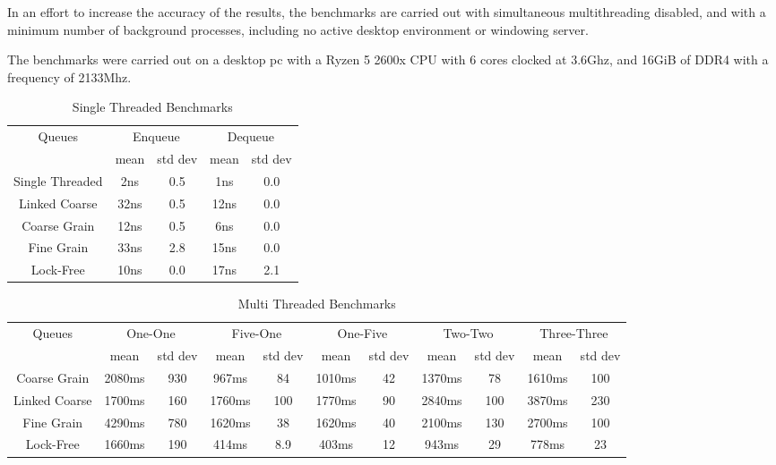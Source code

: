 \documentclass{article}
\begin{document}
In an effort to increase the accuracy of the results, the benchmarks are carried
out with simultaneous multithreading disabled, and with a minimum number of
background processes, including no active desktop environment or windowing
server.

The benchmarks were carried out on a desktop pc with a Ryzen 5 2600x CPU with 6
cores clocked at 3.6Ghz, and 16GiB of DDR4 with a frequency of 2133Mhz.

\begin{table}[h]
\centering
\begin{tabular}{c|cccc}
\hline
\multirow{2}{*}{Queues} & \multicolumn{2}{c}{Enqueue} & \multicolumn{2}{c}{Dequeue} \\
                        & mean        & std dev       & mean        & std dev       \\ \hline
Single Threaded         & 2ns         & 0.5           & 1ns         & 0.0           \\
Linked Coarse           & 32ns        & 0.5           & 12ns        & 0.0           \\
Coarse Grain            & 12ns        & 0.5           & 6ns         & 0.0           \\
Fine Grain              & 33ns        & 2.8           & 15ns        & 0.0           \\
Lock-Free               & 10ns        & 0.0           & 17ns        & 2.1          
\end{tabular}
\caption{Single Threaded Benchmarks}
\label{tab:single-threaded}
\end{table}

\begin{table}[h]
\centering
\begin{tabular}{c|cccccccccc}
\hline
\multirow{2}{*}{Queues} & \multicolumn{2}{c}{One-One} & \multicolumn{2}{c}{Five-One} & \multicolumn{2}{c}{One-Five} & \multicolumn{2}{c}{Two-Two} & \multicolumn{2}{c}{Three-Three} \\
                        & mean        & std dev       & mean        & std dev        & mean        & std dev        & mean        & std dev       & mean        & std dev       \\ \hline
Coarse Grain            & 2080ms      & 930           & 967ms       & 84             & 1010ms      & 42             & 1370ms      & 78            & 1610ms      & 100           \\
Linked Coarse           & 1700ms      & 160           & 1760ms      & 100            & 1770ms      & 90             & 2840ms      & 100           & 3870ms      & 230           \\
Fine Grain              & 4290ms      & 780           & 1620ms      & 38             & 1620ms      & 40             & 2100ms      & 130           & 2700ms      & 100           \\
Lock-Free               & 1660ms      & 190           & 414ms       & 8.9            & 403ms       & 12             & 943ms       & 29            & 778ms       & 23            
\end{tabular}
\caption{Multi Threaded Benchmarks}
\label{tab:multi-threaded}
\end{table}
\end{document}
